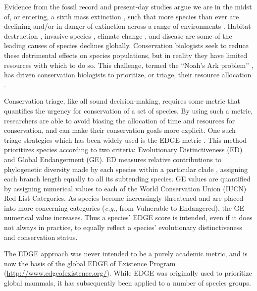 \documentclass[12pt,english]{article}
\begin{document}
Evidence from the fossil record and present-day studies argue we are in the
midst of, or entering, a sixth mass extinction \autocite{Barnosky2011,
Ceballos2015}, such that more species than ever are declining and/or in danger
of extinction across a range of environments \autocite{Wake2008,Thomas2004}.
Habitat destruction \autocite{Brooks2002}, invasive species
\autocite{Molnar2008}, climate change \autocite{Pounds2006}, and disease
\autocite{Lips2006} are some of the leading causes of species declines globally.
Conservation biologists seek to reduce these detrimental effects on species
populations, but in reality they have limited resources with which to do so.
This challenge, termed the ``Noah's Ark problem'' \autocite{Weitzman1998}, has
driven conservation biologists to prioritize, or triage, their resource allocation
\autocite{Bottrill2008}.

Conservation triage, like all sound decision-making, requires some metric that
quantifies the urgency for conservation of a set of species. By using such a
metric, researchers are able to avoid biasing the allocation of time and
resources for conservation, and can make their conservation goals more explicit.
One such triage strategies which has been widely used is the EDGE metric
\autocite[Evolutionary Distinction and Globally Endangered;][]{Isaac2007}. This
method prioritizes species according to two criteria: Evolutionary
Distinctiveness (ED) and Global Endangerment (GE). ED measures relative
contributions to phylogenetic diversity made by each species within a particular
clade \autocite{Isaac2007}, assigning each branch length equally to all its
subtending species. GE values are quantified by assigning numerical values to
each of the World Conservation Union (IUCN) Red List Categories. As species
become increasingly threatened and are placed into more concerning categories
(\emph{e.g.}, from Vulnerable to Endangered), the GE numerical value increases.
Thus a species' EDGE score is intended, even if it does not always in practice,
\autocite[see]{Pearse2015} to equally reflect a species' evolutionary
distinctiveness and conservation status.

The EDGE approach was never intended to be a purely academic metric, and is now
the basis of the global EDGE of Existence Program
(\url{http://www.edgeofexistence.org/}). While EDGE was originally used to
prioritize global mammals, it has subsequently been applied to a number of
species groups.
\end{document}
